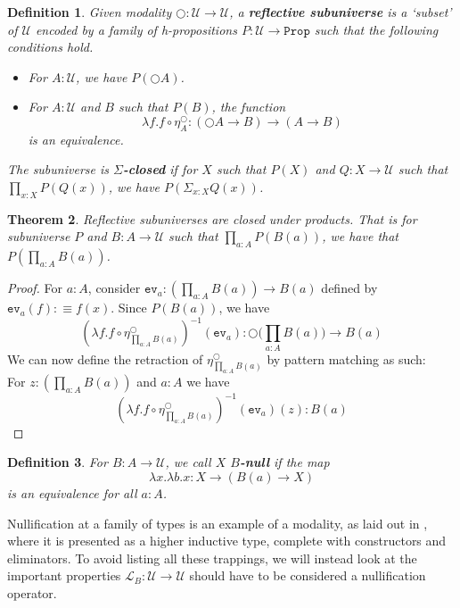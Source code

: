 \documentclass[12pt]{report}
\newtheorem{thm}{Theorem}[section]
\newtheorem{defn}[thm]{Definition}
\begin{document}
\begin{defn}
Given modality $\bigcirc : \mathcal{U} \rightarrow \mathcal{U}$, a \textbf{reflective subuniverse} is a `subset' of $\mathcal{U}$ encoded by a family of h-propositions $P : \mathcal{U} \rightarrow \mathtt{Prop}$ such that the following conditions hold. 
\begin{itemize}
	\item For $A : \mathcal{U}$, we have $P(\bigcirc A)$.
	\item For $A : \mathcal{U}$ and $B$ such that $P(B)$, the function
	$$\lambda f.f \circ \eta_A^\bigcirc : (\bigcirc A \rightarrow B) \rightarrow (A \rightarrow B)$$
	is an equivalence.

\end{itemize}
The subuniverse is $\Sigma$\textbf{-closed} if for $X$ such that $P(X)$ and $Q : X \rightarrow \mathcal{U}$ such that $\prod_{x : X} P(Q(x))$, we have $P(\Sigma_{x : X} Q(x))$.
\end{defn}

\begin{thm}
Reflective subuniverses are closed under products. 
That is for subuniverse $P$ and $B : A \rightarrow \mathcal{U}$ such that $\prod_{a : A}P(B(a))$, we have that $P(\prod_{a : A} B(a))$. 
\end{thm}

\begin{proof}
For $a : A$, consider $\mathtt{ev}_a: (\prod_{a: A}B(a)) \rightarrow B(a)$ defined by $\mathtt{ev}_a (f) : \equiv f(x)$. 
Since $P(B(a))$, we have 
$$(\lambda f.f \circ \eta_{\prod_{a: A}B(a)}^\bigcirc)^{-1} (\mathtt{ev}_a) : \bigcirc\big(\prod_{a: A}B(a)\big) \rightarrow B(a)$$
We can now define the retraction of $\eta^\bigcirc_{\prod_{a : A} B(a)}$ by pattern matching as such:\\
For $z: (\prod_{a: A}B(a))$ and $a : A$ we have 
$$(\lambda f.f \circ \eta_{\prod_{a: A}B(a)}^\bigcirc)^{-1} (\mathtt{ev}_a) (z) : B(a)$$

\end{proof}

\begin{defn}\label{Bnull}
For $B : A \rightarrow \mathcal{U}$, we call $X$ $B$\textbf{-null} if the map 
$$\lambda x. \lambda b.x : X \rightarrow (B(a) \rightarrow X)$$
is an equivalence for all $a : A$.

\end{defn}

Nullification at a family of types is an example of a modality, as laid out in \cite{1706.07526}, where it is presented as a higher inductive type, complete with constructors and eliminators. 
To avoid listing all these trappings, we will instead look at the important properties $\mathcal{L}_B : \mathcal{U} \rightarrow \mathcal{U}$ should have to be considered a nullification operator. 
\end{document}
